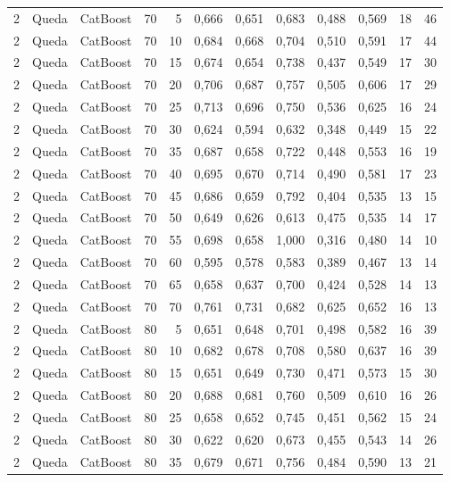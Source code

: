 \begin{longtable}{@{}rllrrrrrrrrr@{}}
2 & Queda & CatBoost & 70 & 5 & 0,666 & 0,651 & 0,683 & 0,488 & 0,569 & 18 & 46 \\
2 & Queda & CatBoost & 70 & 10 & 0,684 & 0,668 & 0,704 & 0,510 & 0,591 & 17 & 44 \\
2 & Queda & CatBoost & 70 & 15 & 0,674 & 0,654 & 0,738 & 0,437 & 0,549 & 17 & 30 \\
2 & Queda & CatBoost & 70 & 20 & 0,706 & 0,687 & 0,757 & 0,505 & 0,606 & 17 & 29 \\
2 & Queda & CatBoost & 70 & 25 & 0,713 & 0,696 & 0,750 & 0,536 & 0,625 & 16 & 24 \\
2 & Queda & CatBoost & 70 & 30 & 0,624 & 0,594 & 0,632 & 0,348 & 0,449 & 15 & 22 \\
2 & Queda & CatBoost & 70 & 35 & 0,687 & 0,658 & 0,722 & 0,448 & 0,553 & 16 & 19 \\
2 & Queda & CatBoost & 70 & 40 & 0,695 & 0,670 & 0,714 & 0,490 & 0,581 & 17 & 23 \\
2 & Queda & CatBoost & 70 & 45 & 0,686 & 0,659 & 0,792 & 0,404 & 0,535 & 13 & 15 \\
2 & Queda & CatBoost & 70 & 50 & 0,649 & 0,626 & 0,613 & 0,475 & 0,535 & 14 & 17 \\
2 & Queda & CatBoost & 70 & 55 & 0,698 & 0,658 & 1,000 & 0,316 & 0,480 & 14 & 10 \\
2 & Queda & CatBoost & 70 & 60 & 0,595 & 0,578 & 0,583 & 0,389 & 0,467 & 13 & 14 \\
2 & Queda & CatBoost & 70 & 65 & 0,658 & 0,637 & 0,700 & 0,424 & 0,528 & 14 & 13 \\
2 & Queda & CatBoost & 70 & 70 & 0,761 & 0,731 & 0,682 & 0,625 & 0,652 & 16 & 13 \\
2 & Queda & CatBoost & 80 & 5 & 0,651 & 0,648 & 0,701 & 0,498 & 0,582 & 16 & 39 \\
2 & Queda & CatBoost & 80 & 10 & 0,682 & 0,678 & 0,708 & 0,580 & 0,637 & 16 & 39 \\
2 & Queda & CatBoost & 80 & 15 & 0,651 & 0,649 & 0,730 & 0,471 & 0,573 & 15 & 30 \\
2 & Queda & CatBoost & 80 & 20 & 0,688 & 0,681 & 0,760 & 0,509 & 0,610 & 16 & 26 \\
2 & Queda & CatBoost & 80 & 25 & 0,658 & 0,652 & 0,745 & 0,451 & 0,562 & 15 & 24 \\
2 & Queda & CatBoost & 80 & 30 & 0,622 & 0,620 & 0,673 & 0,455 & 0,543 & 14 & 26 \\
2 & Queda & CatBoost & 80 & 35 & 0,679 & 0,671 & 0,756 & 0,484 & 0,590 & 13 & 21 \\

\end{longtable}

